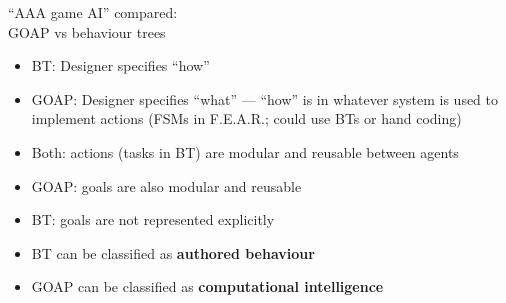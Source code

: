 \begin{frame}{``AAA game AI'' compared:\\GOAP vs behaviour trees}
    \begin{itemize}
        \pause\item BT: Designer specifies ``how''
        \pause\item GOAP: Designer specifies ``what'' --- ``how'' is in whatever system is used to implement
            actions (FSMs in F.E.A.R.; could use BTs or hand coding)
        \pause\item Both: actions (tasks in BT) are modular and reusable between agents
        \pause\item GOAP: goals are also modular and reusable
        \pause\item BT: goals are not represented explicitly
        \pause\item BT can be classified as \textbf{authored behaviour}
        \pause\item GOAP can be classified as \textbf{computational intelligence}
    \end{itemize}
\end{frame}

